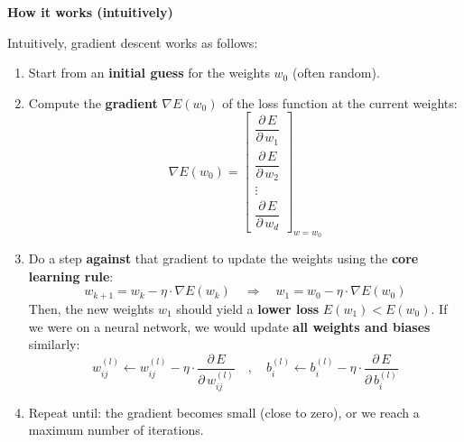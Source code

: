 \begin{flushleft}
    \textcolor{Green3}{ \textbf{How it works (intuitively)}}
\end{flushleft}
Intuitively, gradient descent works as follows:
\begin{enumerate}
    \item Start from an \textbf{initial guess} for the weights $w_{0}$ (often random).
    \item Compute the \textbf{gradient} $\nabla E(w_{0})$ of the loss function at the current weights:
    \begin{equation*}
        \nabla E(w_{0}) = \begin{bmatrix}
            \dfrac{\partial \, E}{\partial \, w_{1}} \\[1.2em]
            \dfrac{\partial \, E}{\partial \, w_{2}} \\[1.2em]
            \vdots \\
            \dfrac{\partial \, E}{\partial \, w_{d}}
        \end{bmatrix}_{w = w_{0}}
    \end{equation*}

    \item Do a step \textbf{against} that gradient to update the weights using the \textbf{core learning rule}:
    \begin{equation*}
        w_{k+1} = w_{k} - \eta \cdot \nabla E(w_{k})
        \quad \Rightarrow \quad
        w_{1} = w_{0} - \eta \cdot \nabla E(w_{0})
    \end{equation*}
    Then, the new weights $w_{1}$ should yield a \textbf{lower loss} $E(w_{1}) < E(w_{0})$. If we were on a neural network, we would update \textbf{all weights and biases} similarly:
    \begin{equation*}
        w_{ij}^{(l)} \leftarrow w_{ij}^{(l)} - \eta \cdot \dfrac{\partial \, E}{\partial \, w_{ij}^{(l)}}
        \quad , \quad
        b_{i}^{(l)} \leftarrow b_{i}^{(l)} - \eta \cdot \dfrac{\partial \, E}{\partial \, b_{i}^{(l)}}
    \end{equation*}
    \item Repeat until: the gradient becomes small (close to zero), or we reach a maximum number of iterations.
\end{enumerate}

